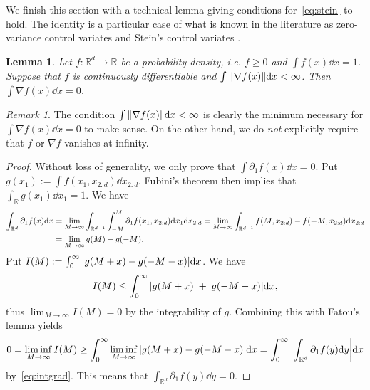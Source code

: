 \documentclass{article}
\theoremstyle{plain}
\newtheorem{lemma}[theorem]{Lemma}
\theoremstyle{definition}
\theoremstyle{remark}
\newtheorem{remark}[theorem]{Remark}
\begin{document}
We finish this section with a technical lemma giving conditions for~\eqref{eq:stein} to hold. The identity is a particular case of what is known in the literature as zero-variance control variates and Stein's control variates \citep{assaraf1999zerovariance,mira2013zerovariance,anastasiou2023steinmethod}.
\begin{lemma}
	\label{lem:stein}
	Let $f: \mathbb R^d \to \mathbb R$ be a probability density, i.e. $f \geq 0$ and $\int f(x) \dd x = 1$. Suppose that $f$ is continuously differentiable and $\int \norm{\nabla f(x)} \dd x < \infty$. Then $\int \nabla f(x) \dd x = 0$.
\end{lemma}
\begin{remark}
	The condition $\int \norm{\nabla f(x)} \dd x < \infty$ is clearly the minimum necessary for $\int \nabla f(x) \dd x =0$ to make sense. On the other hand, we do \textit{not} explicitly require that $f$ or $\nabla f$ vanishes at infinity.
\end{remark}
\begin{proof}
	Without loss of generality, we only prove that $\int \partial_1f(x) \dd x =0$. Put $g(x_1):= \int f(x_1, x_{2:d}) \dd x_{2:d}$. Fubini's theorem then implies that $\int_{\mathbb R} g(x_1)\dd x_1 = 1$. We have
	\begin{equation}
		\label{eq:intgrad}
		\begin{split}
			\int_{\mathbb{R}^d} \partial_1f(x)\dd x &= \lim_{M\to\infty} \int_{\mathbb R^{d-1}} \int_{-M}^M \partial_1f(x_1, x_{2:d}) \dd x_1 \dd x_{2:d} = \lim_{M\to\infty} \int_{\mathbb{R}^{d-1}} f(M, x_{2:d}) - f(-M, x_{2:d}) \dd x_{2:d} \\
			&= \lim_{M\to\infty} g(M) - g(-M).
		\end{split}
	\end{equation}
	Put $I(M):= \int_0^\infty \abs{g(M+x) - g(-M-x)} \dd x$. We have
	\begin{equation*}
		I(M) \leq \int_0^\infty \abs{g(M+x)} + \abs{g(-M-x)} \dd x,
	\end{equation*}
	thus $\lim_{M\to\infty} I(M) = 0$ by the integrability of $g$. Combining this with Fatou's lemma yields
	\begin{equation*}
		0=\liminf_{M\to\infty} I(M) \geq\int_0^\infty \liminf_{M\to\infty} \abs{g(M+x) - g(-M-x)} \dd x = \int_0^\infty \abs{\int_{\mathbb R^d} \partial_1f(y)\dd y} \dd x
	\end{equation*}
	by~\eqref{eq:intgrad}. This means that $\int_{\mathbb R^d} \partial_1f(y)\dd y = 0$.
\end{proof}
\end{document}
